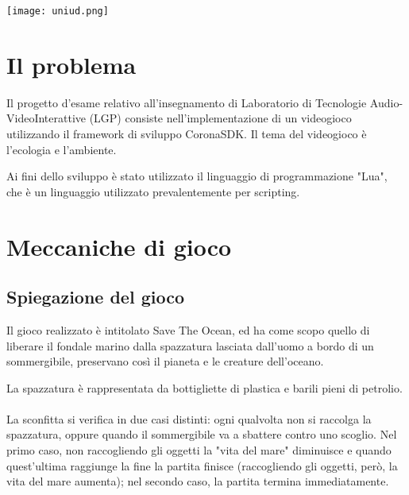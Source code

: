 \documentclass[12pt]{article}
\begin{document}
\begin{titlepage}



\texttt{[image: uniud.png]}\\[1cm] %
 

\vfill %

\end{titlepage}
\tableofcontents
\clearpage
\section{Il problema}
Il progetto d’esame relativo all’insegnamento di Laboratorio di Tecnologie Audio-VideoInterattive (LGP) consiste nell’implementazione di un videogioco utilizzando il framework di sviluppo CoronaSDK. 
Il tema del videogioco è l'ecologia e l'ambiente.

Ai fini dello sviluppo è stato utilizzato il linguaggio di programmazione "Lua", che è un linguaggio utilizzato prevalentemente per 
scripting.

\section{Meccaniche di gioco}
\subsection{Spiegazione del gioco}
Il gioco realizzato è intitolato Save The Ocean, ed ha come scopo quello di liberare il fondale marino dalla spazzatura lasciata dall'uomo a bordo di un sommergibile, preservano così il pianeta e le creature dell'oceano.

La spazzatura è rappresentata da bottigliette di plastica e barili pieni di petrolio.
\\\\

La sconfitta si verifica in due casi distinti: ogni qualvolta non si raccolga la spazzatura, oppure quando il sommergibile va a sbattere contro uno scoglio. Nel primo caso, non raccogliendo gli oggetti la "vita del mare" diminuisce e quando quest'ultima raggiunge la fine la partita finisce (raccogliendo gli oggetti, però, la vita del mare aumenta); nel secondo caso, la partita termina immediatamente. 
 
\end{document}
